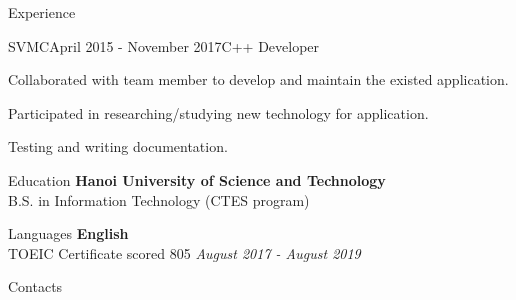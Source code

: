 \documentclass{resume}
\begin{document}
\begin{rSection}{Experience}
    \vspace{0.8cm}\begin{rSubsection}{SVMC}{April 2015 - November 2017}{C++ Developer}{}
      \item Collaborated with team member to develop and maintain the existed application.
      \item Participated in researching/studying new technology for application.
      \item Testing and writing documentation.
    \end{rSubsection}

  
  \end{rSection}

  \newpage

  \begin{rSection}{Education}
    {\bf Hanoi University of Science and Technology} \\ 
    { B.S. in Information Technology (CTES program) } \\
  \end{rSection}


  \begin{rSection}{Languages}
    {\bf English} \\ 
    { TOEIC Certificate scored 805  } \hfill {\em August 2017 - August 2019} \\
  \end{rSection}

  \begin{rSection}{Contacts}
  \end{rSection}
\end{document}
